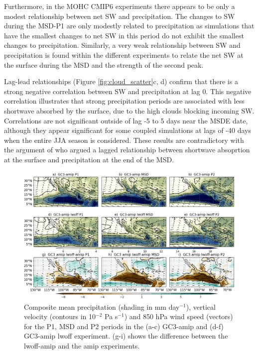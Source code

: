 Furthermore, in the MOHC CMIP6 experiments there appears to be only a modest relationship between net SW and precipitation. The changes to SW during the MSD-P1 are only modestly related to precipitation as simulations that have the smallest changes to net SW in this period do not exhibit the smallest changes to precipitation. Similarly, a very weak relationship between SW and precipitation is found within the different experiments to relate the net SW at the surface during the MSD and the strength of the second peak. 

Lag-lead relationships (Figure \ref{fig:cloud_scatter}c, d) confirm that there is a strong negative correlation between SW and precipitation at lag 0. This negative correlation illustrates that strong precipitation periods are associated with less shortwave absorbed by the surface, due to the high clouds blocking incoming SW. Correlations are not significant outside of lag -5 to 5 days near the MSDE date, although they appear significant for some coupled simulations at lags of -40 days when the entire JJA season is considered. These results are contradictory with the argument of \cite{karnauskas2013} who argued a lagged relationship between shortwave absoprtion at the surface and precipitation at the end of the MSD. 
 
\begin{figure}[t!]
\includegraphics[width=\linewidth]{figures/lwfig_clim_1.png}
\caption[Composite moisture flux and wind speed]{Composite mean precipitation (shading in mm day$^{-1}$), vertical velocity (contours in 10$^{-2}$ Pa s$^{-1}$) and 850 hPa wind speed (vectors) for the P1, MSD and P2 periods in the (a-c) GC3-amip and (d-f) GC3-amip lwoff experiment. (g-i) shows the difference between the lwoff-amip and the amip experiments.}
\label{fig:lwoff}
\end{figure}

